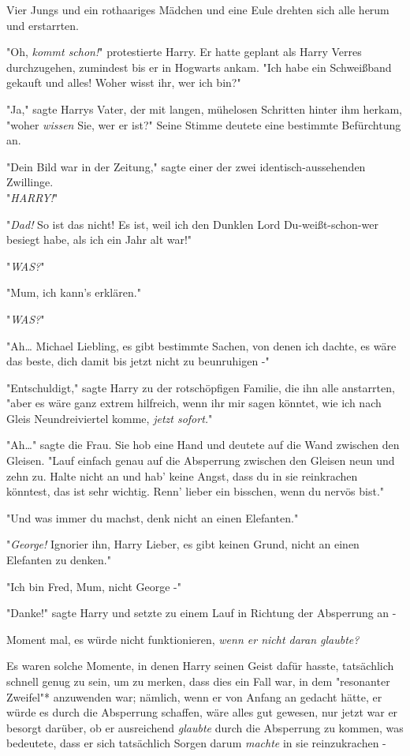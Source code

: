 {Vier Jungs und ein rothaariges Mädchen und eine Eule drehten sich alle herum und erstarrten.

"Oh, \emph{kommt schon!}" protestierte Harry. Er hatte geplant als Harry Verres durchzugehen, zumindest bis er in Hogwarts ankam. "Ich habe ein Schweißband gekauft und alles! Woher wisst ihr, wer ich bin?"

"Ja," sagte Harrys Vater, der mit langen, mühelosen Schritten hinter ihm herkam, "woher \emph{wissen} Sie, wer er ist?" Seine Stimme deutete eine bestimmte Befürchtung an.

"Dein Bild war in der Zeitung," sagte einer der zwei identisch-aussehenden Zwillinge.\\ "\emph{HARRY!}"

"\emph{Dad!} So ist das nicht! Es ist, weil ich den Dunklen Lord Du-weißt-schon-wer besiegt habe, als ich ein Jahr alt war!"

"\emph{WAS?}"

"Mum, ich kann's erklären."

"\emph{WAS?}"

"Ah… Michael Liebling, es gibt bestimmte Sachen, von denen ich dachte, es wäre das beste, dich damit bis jetzt nicht zu beunruhigen -"

"Entschuldigt," sagte Harry zu der rotschöpfigen Familie, die ihn alle anstarrten, "aber es wäre ganz extrem hilfreich, wenn ihr mir sagen könntet, wie ich nach Gleis Neundreiviertel komme, \emph{jetzt sofort.}"

"Ah…" sagte die Frau. Sie hob eine Hand und deutete auf die Wand zwischen den Gleisen. "Lauf einfach genau auf die Absperrung zwischen den Gleisen neun und zehn zu. Halte nicht an und hab' keine Angst, dass du in sie reinkrachen könntest, das ist sehr wichtig. Renn' lieber ein bisschen, wenn du nervös bist."

"Und was immer du machst, denk nicht an einen Elefanten."

"\emph{George!} Ignorier ihn, Harry Lieber, es gibt keinen Grund, nicht an einen Elefanten zu denken."

"Ich bin Fred, Mum, nicht George -"

"Danke!" sagte Harry und setzte zu einem Lauf in Richtung der Absperrung an -

Moment mal, es würde nicht funktionieren, \emph{wenn er nicht daran glaubte?}

Es waren solche Momente, in denen Harry seinen Geist dafür hasste, tatsächlich schnell genug zu sein, um zu merken, dass dies ein Fall war, in dem "resonanter Zweifel"* anzuwenden war; nämlich, wenn er von Anfang an gedacht hätte, er würde es durch die Absperrung schaffen, wäre alles gut gewesen, nur jetzt war er besorgt darüber, ob er ausreichend \emph{glaubte} durch die Absperrung zu kommen, was bedeutete, dass er sich tatsächlich Sorgen darum \emph{machte} in sie reinzukrachen -

}

